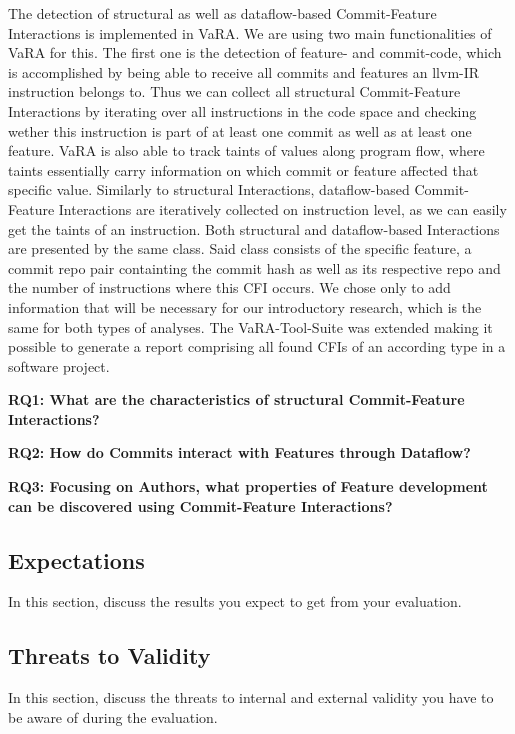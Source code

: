 The detection of structural as well as dataflow-based Commit-Feature Interactions is implemented in VaRA.
We are using two main functionalities of VaRA for this. 
The first one is the detection of feature- and commit-code, which is accomplished by being able to receive all commits and features an llvm-IR instruction belongs to.
Thus we can collect all structural Commit-Feature Interactions by iterating over all instructions in the code space and checking wether this instruction is part of at least one commit as well as at least one feature.
VaRA is also able to track taints of values along program flow, where taints essentially carry information on which commit or feature affected that specific value.
Similarly to structural Interactions, dataflow-based Commit-Feature Interactions are iteratively collected on instruction level, as we can easily get the taints of an instruction.
Both structural and dataflow-based Interactions are presented by the same class.
Said class consists of the specific feature, a commit repo pair containting the commit hash as well as its respective repo and the number of instructions where this CFI occurs.
We chose only to add information that will be necessary for our introductory research, which is the same for both types of analyses.
The VaRA-Tool-Suite was extended making it possible to generate a report comprising all found CFIs of an according type in a software project.

\textbf{RQ1: What are the characteristics of structural Commit-Feature Interactions?}

\textbf{RQ2: How do Commits interact with Features through Dataflow?}

\textbf{RQ3: Focusing on Authors, what properties of Feature development can be discovered using Commit-Feature Interactions?}

\subsection*{Expectations}\label{sec:expectations}

In this section, discuss the results you expect to get from your evaluation.

\subsection*{Threats to Validity}\label{sec:threats}

In this section, discuss the threats to internal and external validity you have to be aware of during the evaluation.
